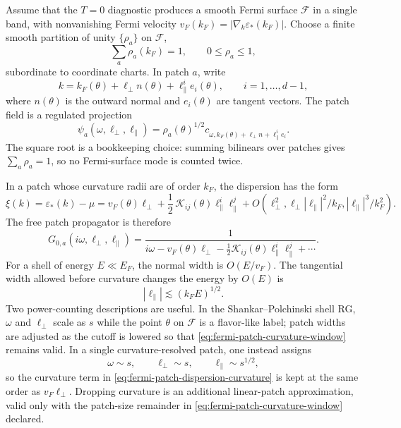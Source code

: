 \begin{definition}
\label{def:fermi-surface-patch-cover}
Assume that the \(T=0\) diagnostic produces a smooth Fermi surface
\(\mathcal F\) in a single band, with nonvanishing Fermi velocity
\(v_F(k_F)=|\nabla_k\varepsilon_*(k_F)|\).  Choose a finite smooth partition of
unity \(\{\rho_a\}\) on \(\mathcal F\),
\[
  \sum_a\rho_a(k_F)=1,\qquad 0\le \rho_a\le1,
\]
subordinate to coordinate charts.  In patch \(a\), write
\[
  k=k_F(\theta)+\ell_\perp n(\theta)+\ell_\parallel^i e_i(\theta),
  \qquad i=1,\ldots,d-1,
\]
where \(n(\theta)\) is the outward normal and \(e_i(\theta)\) are tangent
vectors.  The patch field is a regulated projection
\[
  \psi_a(\omega,\ell_\perp,\ell_\parallel)
  =
  \rho_a(\theta)^{1/2}
  c_{\omega,k_F(\theta)+\ell_\perp n+\ell_\parallel^ie_i}.
\]
The square root is a bookkeeping choice: summing bilinears over patches gives
\(\sum_a\rho_a=1\), so no Fermi-surface mode is counted twice.
\end{definition}

In a patch whose curvature radii are of order \(k_F\), the dispersion has the
form
\begin{equation}
  \xi(k)
  =
  \varepsilon_*(k)-\mu
  =
  v_F(\theta)\ell_\perp
  +
  \frac12\,\mathcal K_{ij}(\theta)\ell_\parallel^i\ell_\parallel^j
  +O(\ell_\perp^2,\ell_\perp|\ell_\parallel|^2/k_F,|\ell_\parallel|^3/k_F^2).
  \label{eq:fermi-patch-dispersion-curvature}
\end{equation}
The free patch propagator is therefore
\begin{equation}
  G_{0,a}(i\omega,\ell_\perp,\ell_\parallel)
  =
  \frac{1}
  {i\omega-v_F(\theta)\ell_\perp
    -\frac12\mathcal K_{ij}(\theta)\ell_\parallel^i\ell_\parallel^j+\cdots}.
  \label{eq:fermi-free-patch-propagator}
\end{equation}
For a shell of energy \(E\ll E_F\), the normal width is
\(O(E/v_F)\).  The tangential width allowed before curvature changes the energy
by \(O(E)\) is
\begin{equation}
  |\ell_\parallel|\lesssim (k_FE)^{1/2}.
  \label{eq:fermi-patch-curvature-window}
\end{equation}
Two power-counting descriptions are useful.  In the Shankar--Polchinski shell
RG, \(\omega\) and \(\ell_\perp\) scale as \(s\) while the point \(\theta\) on
\(\mathcal F\) is a flavor-like label; patch widths are adjusted as the cutoff
is lowered so that \eqref{eq:fermi-patch-curvature-window} remains valid.  In a
single curvature-resolved patch, one instead assigns
\[
  \omega\sim s,\qquad \ell_\perp\sim s,\qquad
  \ell_\parallel\sim s^{1/2},
\]
so the curvature term in \eqref{eq:fermi-patch-dispersion-curvature} is kept at
the same order as \(v_F\ell_\perp\).  Dropping curvature is an additional
linear-patch approximation, valid only with the patch-size remainder in
\eqref{eq:fermi-patch-curvature-window} declared.

